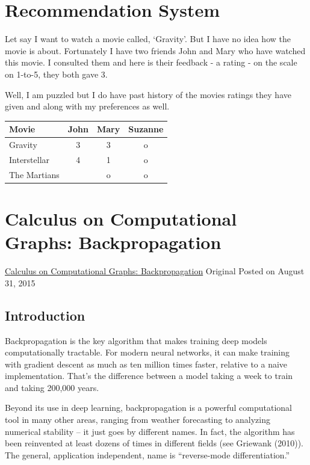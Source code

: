 \documentclass[a4paper,12pt]{report}%
\begin{document}
\section{Recommendation System}
Let say I want to watch a movie called, `Gravity'. But I have no idea how the movie is about. Fortunately I have two friends John and Mary who have watched this movie. I consulted them and here is their feedback - a rating - on the scale on 1-to-5, they both gave 3.

Well, I am puzzled but I do have past history of the movies ratings they have given and along with my preferences as well.

\begin{tabular}{|l|c|c||c|}
  \hline
  Movie         & John  & Mary  & Suzanne \\
  \hline
  Gravity       &   3   & 3     & o \\
  Interstellar  &   4   & 1     & o\\
  The Martians  &       & o     & o \\
  \hline
\end{tabular}


\section{Calculus on Computational Graphs: Backpropagation}

\href{https://colah.github.io/posts/2015-08-Backprop/}{Calculus on Computational Graphs: Backpropagation} Original Posted on August 31, 2015

\subsection{Introduction}
Backpropagation is the key algorithm that makes training deep models computationally tractable. For modern neural networks, it can make training with gradient descent as much as ten million times faster, relative to a naive implementation. That’s the difference between a model taking a week to train and taking 200,000 years.

Beyond its use in deep learning, backpropagation is a powerful computational tool in many other areas, ranging from weather forecasting to analyzing numerical stability – it just goes by different names. In fact, the algorithm has been reinvented at least dozens of times in different fields (see Griewank (2010)). The general, application independent, name is “reverse-mode differentiation.”
\end{document}
